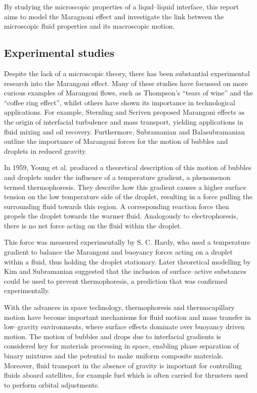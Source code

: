 By studying the microscopic properties of a liqud--liquid interface, this report aims to model the Maragnoni effect and investigate the link between the microscopic fluid properties and its macroscopic motion.

\subsection{Experimental studies}
Despite the lack of a microscopic theory, there has been substantial experimental research into the Marangoni effect.
Many of these studies have focussed on more curious examples of Marangoni flows, such as Thompson's ``tears of wine''\cite{JThompson,Venerus,Tadmor,Cazabat1995} and the ``coffee ring effect'',\cite{Sefian,HuLarson,Sefiane2014} whilst others have shown its importance in technological applications.
For example, Sternling and Scriven\cite{SternlingScriven} proposed Marangoni effects as the origin of interfacial turbulence and mass transport, yielding applications in fluid mixing and oil recovery.\cite{Aguilera2005,LyfordA,LyfordB} 
Furthermore, Subramanian and Balasubramanian outline the importance of Marangoni forces for the motion of bubbles and droplets in reduced gravity.\cite{MotionOfBubblesAndDrops} 

In 1959, Young et al. produced a theoretical description of this motion of bubbles and droplets under the influence of a temperature gradient, a phenomenon termed thermophoresis.\cite{Young1959}
They describe how this gradient causes a higher surface tension on the low temperature side of the droplet, resulting in a force pulling the surrounding fluid towards this region.
A corresponding reaction force then propels the droplet towards the warmer fluid.
Analogously to electrophoresis, there is no net force acting on the fluid within the droplet.

This force was measured experimentally by S. C. Hardy,\cite{Hardy1978} who used a temperature gradient to balance the Marangoni and buoyancy forces acting on a droplet within a fluid, thus holding the droplet stationary.
Later theoretical modelling by Kim and Subramanian suggested that the inclusion of surface--active substances could be used to prevent thermophoresis,\cite{KimSubramanianA,KimSubramanianB} a prediction that was confirmed experimentally.\cite{BartonSubramanian,ChenStebe}

With the advances in space technology, thermophoresis and thermocapillary motion have become important mechanisms for fluid motion and mass transfer in low--gravity environments, where surface effects dominate over buoyancy driven motion.
The motion of bubbles and drops due to interfacial gradients is considered key for materials processing in space, enabling phase separation of binary mixtures and the potential to make uniform composite materials.\cite{BartonSubramanian}
Moreover, fluid transport in the absence of gravity is important for controlling fluids aboard satellites, for example fuel which is often carried for thrusters used to perform orbital adjustments.\cite{MotionOfBubblesAndDrops} 

